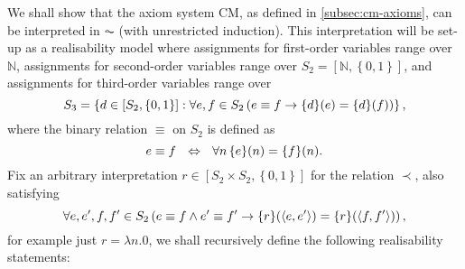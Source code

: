 \documentclass[11pt]{article}
\theoremstyle{plain}
\theoremstyle{definition}
\newcommand{\tuple}[1]{\left\langle #1 \right\rangle}
\begin{document}
We shall show that the axiom system $\mathrm{CM}$, as defined in \autoref{subsec:cm-axioms}, can be interpreted in $\AC$ (with unrestricted induction). This interpretation will be set-up as a realisability model where assignments for first-order variables range over $\mathbb{N}$, assignments for second-order variables range over $S_2 = \left[\mathbb{N}, \left\{0, 1\right\}\right]$, and assignments for third-order variables range over
\[S_3 = \left\{d \in \left[S_2, \left\{0, 1\right\}\right] : \forall e, f \in S_2 \left(e \equiv f \rightarrow \mleft\{d\mright\}\mleft(e\mright) = \mleft\{d\mright\}\mleft(f\mright)\right)\right\},\]
where the binary relation $\equiv$ on $S_2$ is defined as
\[e \equiv f \ \ \ratio\Leftrightarrow \ \ \forall n \, \mleft\{e\mright\}\mleft(n\mright) = \mleft\{f\mright\}\mleft(n\mright).\]
Fix an arbitrary interpretation $r \in \left[S_2 \times S_2, \left\{0, 1\right\}\right]$ for the relation $\prec$, also satisfying
\[\forall e, e', f, f' \in S_2 \left(e \equiv f \land e' \equiv f' \rightarrow \mleft\{r\mright\}\mleft(\tuple{e, e'}\mright) = \mleft\{r\mright\}\mleft(\tuple{f, f'}\mright)\right),\]
for example just $r = \lambda n. 0$, we shall recursively define the following realisability statements:
\end{document}
